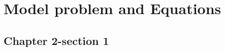 \chapter{Model problem and Equations}
\label{sec:chapter2}

\minitoc 


	\section{Chapter 2-section 1}
\label{sec:chapter_1_sec_1}

